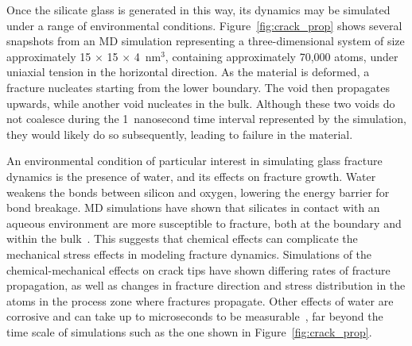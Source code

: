 Once the silicate glass is generated in this way, its dynamics may be simulated under a range of environmental conditions.  Figure~\ref{fig:crack_prop} shows several snapshots from an MD simulation representing a three-dimensional system of size approximately 15 $\times$ 15 $\times$ 4~nm$^3$, containing approximately 70,000 atoms, under uniaxial tension in the horizontal direction.  As the material is deformed, a fracture nucleates starting from the lower boundary.  The void then propagates upwards, while another void nucleates in the bulk.  Although these two voids do not coalesce during the 1~nanosecond time interval represented by the simulation, they would likely do so subsequently, leading to failure in the material.

An environmental condition of particular interest in simulating glass fracture dynamics is the presence of water, and its effects on fracture growth. Water weakens the bonds between silicon and oxygen, lowering the energy barrier for bond breakage. MD simulations have shown that silicates in contact with an aqueous environment are more susceptible to fracture, both at the boundary and within the bulk~\cite{chem_effects}. This suggests that chemical effects can complicate the mechanical stress effects in modeling fracture dynamics. Simulations of the chemical-mechanical effects on crack tips have shown differing rates of fracture propagation, as well as changes in fracture direction and stress distribution in the atoms in the process zone where fractures propagate. Other effects of water are corrosive and can take up to microseconds to be measurable~\cite{markpres}, far beyond the time scale of simulations such as the one shown in Figure~\ref{fig:crack_prop}.




